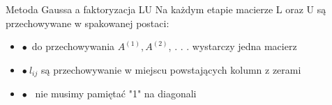 \begin{frame}{Metoda Gaussa a faktoryzacja LU}
Na każdym etapie macierze L oraz U są przechowywane w spakowanej postaci:\\
\begin{itemize}
    \item $\bullet$~do przechowywania $A^{(1)}, A^{(2)}$, . . . wystarczy jedna macierz 
    \item $\bullet~ l_{ij}$ są przechowywanie w miejscu powstających kolumn z zerami
    \item $\bullet$~ nie musimy pamiętać "1" na diagonali
\end{itemize}

 \newline

\end{frame}